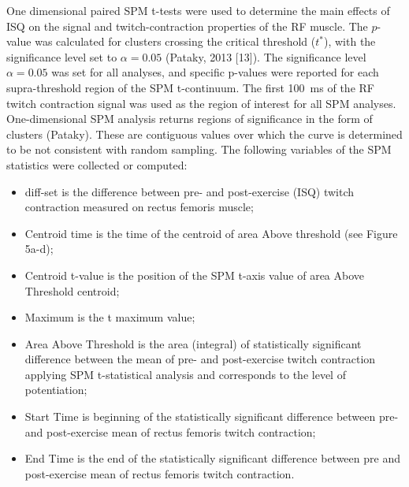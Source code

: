 \documentclass[utf8]{style/FrontiersinHarvard}
\begin{document}
One dimensional paired SPM t-tests were used to determine the main effects of ISQ on the signal and twitch-contraction properties of the RF muscle.
The $ p $-value was calculated for clusters crossing the critical threshold ($ t^{*} $), with the significance level set to $ \alpha = 0.05 $ (Pataky, 2013 [13]).
The significance level $ \alpha = 0.05 $ was set for all analyses, and specific p-values were reported for each supra-threshold region of the SPM t-continuum.
The first \SI{100}{\milli \second} of the RF twitch contraction signal was used as the region of interest for all SPM analyses.
One-dimensional SPM analysis returns regions of significance in the form of clusters (Pataky).
These are contiguous values over which the curve is determined to be not consistent with random sampling.
The following variables of the SPM statistics were collected or computed:
\begin{itemize}

    \item diff-set is the difference between pre- and post-exercise (ISQ) twitch contraction measured on rectus femoris muscle;

    \item Centroid time is the time of the centroid of area Above threshold (see Figure 5a-d);

    \item Centroid t-value is the position of the SPM t-axis value of area Above Threshold centroid;

    \item Maximum is the t maximum value;

    \item Area Above Threshold is the area (integral) of statistically significant difference between the mean of pre- and post-exercise twitch contraction applying SPM t-statistical analysis and corresponds to the level of potentiation;

    \item Start Time is beginning of the statistically significant difference between pre- and post-exercise mean of rectus femoris twitch contraction;

    \item End Time is the end of the statistically significant difference between pre and post-exercise mean of rectus femoris twitch contraction.

\end{itemize}
\end{document}
